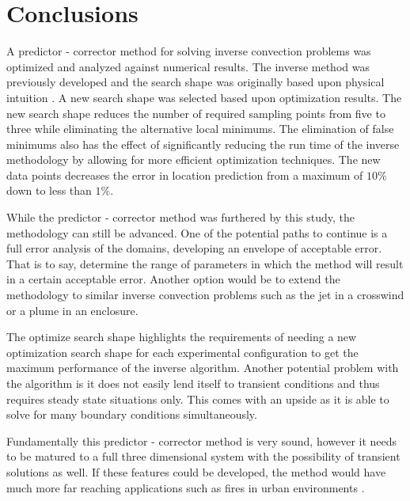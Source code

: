 \documentclass[preprint,12pt]{elsarticle}
\begin{document}
\section{Conclusions}
A predictor - corrector method for solving inverse convection problems was optimized and analyzed against numerical results.  The inverse method was previously developed and the search shape was originally based upon physical intuition \cite{ijhmt1,cht12}.  A new search shape was selected based upon optimization results.  The new search shape reduces the number of required sampling points from five to three while eliminating the alternative local minimums.  The elimination of false minimums also has the effect of significantly reducing the run time of the inverse methodology by allowing for more efficient optimization techniques.  The new data points decreases the error in location prediction from a maximum of $10\%$ \cite{ijhmt1} down to less than $1\%$.  

While the predictor - corrector method was furthered by this study, the methodology can still be advanced.  One of the potential paths to continue is a full error analysis of the domains, developing  an envelope of acceptable error.  That is to say, determine the range of parameters in which the method will result in a certain acceptable error.  Another option would be to extend the methodology to similar inverse convection problems such as the jet in a crosswind or a plume in an enclosure.

The optimize search shape highlights the requirements of needing a new optimization search shape for each experimental configuration to get the maximum performance of the inverse algorithm.  Another potential problem with the algorithm is it does not easily lend itself to transient conditions and thus requires steady state situations only.  This comes with an upside as it is able to solve for many boundary conditions simultaneously.

Fundamentally this predictor - corrector method is very sound, however it needs to be matured to a full three dimensional system with the possibility of transient solutions as well.  If these features could be developed, the method would have much more far reaching applications such as fires in urban environments \cite{hu,blanchard}.

\appendix

{}

\end{document}
